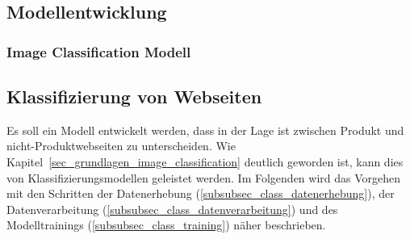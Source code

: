 \subsection{Modellentwicklung}

\subsubsection{Image Classification Modell}


\subsection{Klassifizierung von Webseiten}\label{subsec_klassifierung_websites}
Es soll ein Modell entwickelt werden, dass in der Lage ist zwischen Produkt und nicht-Produktwebseiten zu unterscheiden.
Wie Kapitel~\ref{sec_grundlagen_image_classification} deutlich geworden ist, kann dies von Klassifizierungsmodellen geleistet werden.
Im Folgenden wird das Vorgehen mit den Schritten der Datenerhebung (\ref{subsubsec_class_datenerhebung}), der Datenverarbeitung (\ref{subsubsec_class_datenverarbeitung}) und des Modelltrainings (\ref{subsubsec_class_training}) näher beschrieben.


